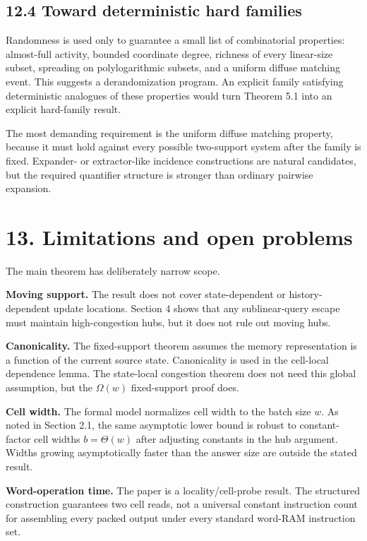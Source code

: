 \documentclass[
]{article}
\begin{document}
\hypertarget{toward-deterministic-hard-families}{%
\subsection{12.4 Toward deterministic hard
families}\label{toward-deterministic-hard-families}}

Randomness is used only to guarantee a small list of combinatorial
properties: almost-full activity, bounded coordinate degree, richness of
every linear-size subset, spreading on polylogarithmic subsets, and a
uniform diffuse matching event. This suggests a derandomization program.
An explicit family satisfying deterministic analogues of these
properties would turn Theorem 5.1 into an explicit hard-family result.

The most demanding requirement is the uniform diffuse matching property,
because it must hold against every possible two-support system after the
family is fixed. Expander- or extractor-like incidence constructions are
natural candidates, but the required quantifier structure is stronger
than ordinary pairwise expansion.

\hypertarget{limitations-and-open-problems}{%
\section{13. Limitations and open
problems}\label{limitations-and-open-problems}}

The main theorem has deliberately narrow scope.

\textbf{Moving support.} The result does not cover state-dependent or
history-dependent update locations. Section 4 shows that any
sublinear-query escape must maintain high-congestion hubs, but it does
not rule out moving hubs.

\textbf{Canonicality.} The fixed-support theorem assumes the memory
representation is a function of the current source state. Canonicality
is used in the cell-local dependence lemma. The state-local congestion
theorem does not need this global assumption, but the \(\Omega(w)\)
fixed-support proof does.

\textbf{Cell width.} The formal model normalizes cell width to the batch
size \(w\). As noted in Section 2.1, the same asymptotic lower bound is
robust to constant-factor cell widths \(b=\Theta(w)\) after adjusting
constants in the hub argument. Widths growing asymptotically faster than
the answer size are outside the stated result.

\textbf{Word-operation time.} The paper is a locality/cell-probe result.
The structured construction guarantees two cell reads, not a universal
constant instruction count for assembling every packed output under
every standard word-RAM instruction set.
\end{document}
